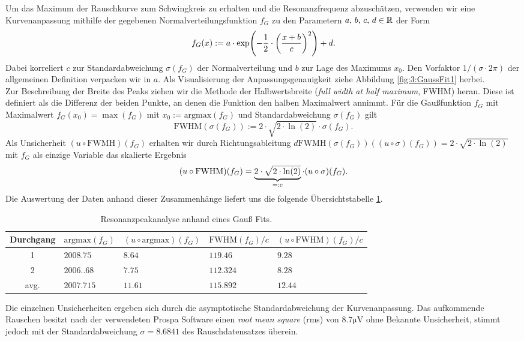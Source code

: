 \documentclass[../../main.tex]{subfiles}
\begin{document}
    Um das Maximum der Rauschkurve zum Schwingkreis zu erhalten und die Resonanzfrequenz abzuschätzen, verwenden wir eine Kurvenanpassung mithilfe der gegebenen Normalverteilungsfunktion $f_G$ zu den Parametern $a,\, b,\, c,\, d\in\mathbb{R}$ der Form
    \[
        f_G(x) := a\cdot\exp(-\frac{1}{2}\cdot\left(\frac{x + b}{c}\right)^2) + d.
    \]
    Dabei korreliert $c$ zur Standardabweichung $\sigma(f_G)$ der Normalverteilung und $b$ zur Lage des Maximums $x_0$. Den Vorfaktor $1/(\sigma\cdot 2\pi)$ der allgemeinen Definition verpacken wir in $a$. Als Visualisierung der Anpassungsgenauigkeit ziehe Abbildung \ref{fig:3:GaussFit1} herbei. \\
    Zur Beschreibung der Breite des Peaks ziehen wir die Methode der Halbwertsbreite (\emph{full width at half maximum}, FWHM) heran. Diese ist definiert als die Differenz der beiden Punkte, an denen die Funktion den halben Maximalwert annimmt. Für die Gaußfunktion $f_G$ mit Maximalwert $f_G(x_0) = \max(f_G)$ mit $x_0:=\text{argmax}(f_G)$ und Standardabweichung $\sigma(f_G)$ gilt
    \[
        \text{FWHM}(\sigma(f_G)) := 2\cdot\sqrt{2\cdot\ln(2)}\cdot\sigma(f_G).
    \]
    Als Unsicherheit $(u\circ\text{FWMH})(f_G)$ erhalten wir durch Richtungsableitung $d\text{FWMH}(\sigma(f_G))((u\circ\sigma)(f_G)) = 2\cdot\sqrt{2\cdot\ln(2)}$ mit $f_G$ als einzige Variable das skalierte Ergebnis \cite[wiki]{enwiki:FWHM}
    \[
        (u\circ\text{FWHM})(f_G) = \underbrace{2\cdot\sqrt{2\cdot\ln(2)}}_{=:c}\cdot (u\circ\sigma)(f_G).
    \] 
    Die Auswertung der Daten anhand dieser Zusammenhänge liefert uns die folgende Übersichtstabelle \ref{tab:3:PeakInfo}.
    \begin{table}[H]
       \centering
       \begin{tabular}{c|ll|ll}
            \textbf{Durchgang} & $\text{argmax}(f_G)$ & $(u\circ\text{argmax})(f_G)$ & $\text{FWHM}(f_G)/c$ & $(u\circ\text{FWHM})(f_G)/c$ \\
            \hline
            1 & $2008.75$ & $8.64$ & $119.46$ & $9.28$ \\
            2 & $2006..68$ & $7.75$ & $112.324$ & $8.28$ \\
            \hline
            avg. & $2007.715$ & $11.61$ & $115.892$ & $12.44$
        \end{tabular} 
        \caption{Resonanzpeakanalyse anhand eines Gauß Fits.}
        \label{tab:3:PeakInfo}
    \end{table}
    Die einzelnen Unsicherheiten ergeben sich durch die asymptotische Standardabweichung der Kurvenanpassung. Das aufkommende Rauschen besitzt nach der verwendeten Prospa Software einen \emph{root mean square} (rms) von $8.7\si{\micro\volt}$ ohne Bekannte Unsicherheit, stimmt jedoch mit der Standardabweichung $\sigma = 8.6841$ des Rauschdatensatzes überein. \\
\end{document}
